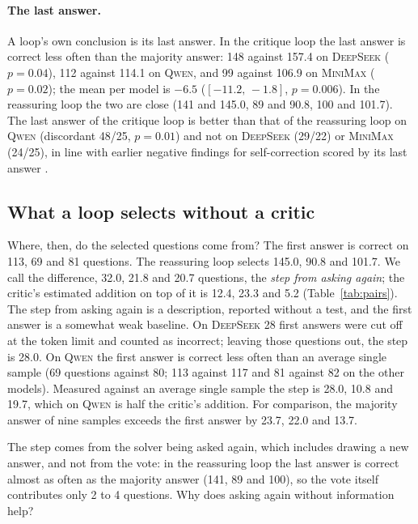 \documentclass[11pt]{article}
\newcommand{\ds}{\textsc{DeepSeek}}
\newcommand{\qw}{\textsc{Qwen}}
\newcommand{\mm}{\textsc{MiniMax}}
\newcommand{\ci}[2]{$[#1,\,#2]$}
\begin{document}
\paragraph{The last answer.}
A loop's own conclusion is its last answer.
In the critique loop the last answer is correct less often than the majority answer: 148 against 157.4 on \ds{} ($p=0.04$), 112 against 114.1 on \qw, and 99 against 106.9 on \mm{} ($p=0.02$); the mean per model is $-6.5$ (\ci{-11.2}{-1.8}, $p=0.006$).
In the reassuring loop the two are close (141 and 145.0, 89 and 90.8, 100 and 101.7).
The last answer of the critique loop is better than that of the reassuring loop on \qw{} (discordant 48/25, $p=0.01$) and not on \ds{} (29/22) or \mm{} (24/25), in line with earlier negative findings for self-correction scored by its last answer \citep{huang2024cannot}.

\subsection{What a loop selects without a critic}
\label{sec:mech}

Where, then, do the selected questions come from?
The first answer is correct on 113, 69 and 81 questions.
The reassuring loop selects 145.0, 90.8 and 101.7.
We call the difference, 32.0, 21.8 and 20.7 questions, the \emph{step from asking again}; the critic's estimated addition on top of it is 12.4, 23.3 and 5.2 (Table~\ref{tab:pairs}).
The step from asking again is a description, reported without a test, and the first answer is a somewhat weak baseline.
On \ds{} 28 first answers were cut off at the token limit and counted as incorrect; leaving those questions out, the step is 28.0.
On \qw{} the first answer is correct less often than an average single sample (69 questions against 80; 113 against 117 and 81 against 82 on the other models).
Measured against an average single sample the step is 28.0, 10.8 and 19.7, which on \qw{} is half the critic's addition.
For comparison, the majority answer of nine samples exceeds the first answer by 23.7, 22.0 and 13.7.

The step comes from the solver being asked again, which includes drawing a new answer, and not from the vote: in the reassuring loop the last answer is correct almost as often as the majority answer (141, 89 and 100), so the vote itself contributes only 2 to 4 questions.
Why does asking again without information help?
\end{document}
